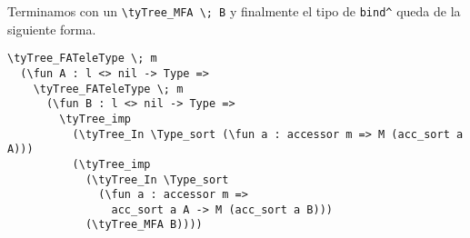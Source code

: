 \begin{enumerate}
    Terminamos con un \lstinline{\tyTree_MFA \; B} y finalmente el tipo de \lstinline{bind^} queda de la siguiente forma.
    \begin{lstlisting}
\tyTree_FATeleType \; m
  (\fun A : l <> nil -> Type =>
    \tyTree_FATeleType \; m
      (\fun B : l <> nil -> Type =>
        \tyTree_imp
          (\tyTree_In \Type_sort (\fun a : accessor m => M (acc_sort a A)))
          (\tyTree_imp
            (\tyTree_In \Type_sort
              (\fun a : accessor m =>
                acc_sort a A -> M (acc_sort a B))) 
            (\tyTree_MFA B))))
    \end{lstlisting}
\end{enumerate}